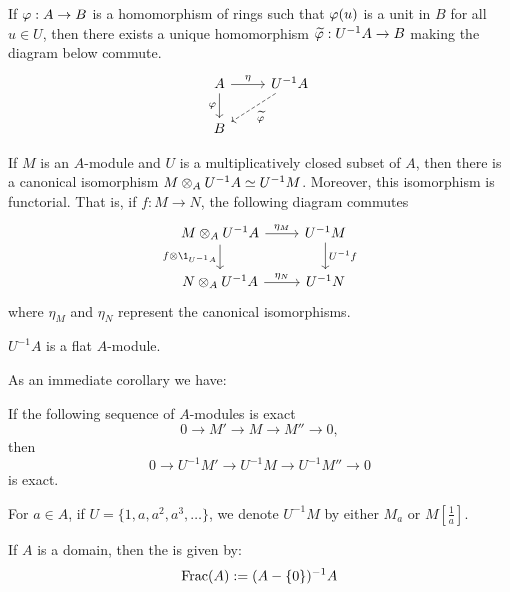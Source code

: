 \documentclass{ximera}
\begin{document}
\begin{proposition}
  If $\varphi:A\to B$ is a homomorphism of rings such that $\varphi(u)$ is a
  unit in $B$ for all $u\in U$, then there exists a unique
  homomorphism $\widetilde{\varphi}: U^{-1}A\to B$ making the diagram below
  commute.
  \[
  \begin{tikzcd}
    A \arrow[r,"\eta"] \arrow[d,swap,"\ph"] & U^{-1}A  \arrow[dl,dashed,"\tilde{\ph}"]\\
    B &
  \end{tikzcd}
  \]
\end{proposition}


\begin{proposition}
  If $M$ is an $A$-module and $U$ is a multiplicatively closed subset
  of $A$, then there is a canonical isomorphism $M\otimes_A U^{-1}
  A\simeq U^{-1}M$. Moreover, this isomorphism is functorial. That is,
  if $f:M\to N$, the following diagram commutes
  \[
  \begin{tikzcd}
  M\tensor_A U^{-1}A \arrow[r,"\eta_M"] \arrow[d,swap,"f\tensor \1_{U^{-1}A}"] & U^{-1}M \arrow[d,"U^{-1}f"]\\
  N\tensor_A U^{-1} A \arrow[r,"\eta_N"] & U^{-1}N
  \end{tikzcd}
  \]
  where $\eta_M$  and $\eta_N$ represent the canonical isomorphisms.
\end{proposition}



\begin{proposition} $U^{-1}A$ is a flat $A$-module.
\end{proposition}

As an immediate corollary we have:

\begin{corollary} If the following sequence of $A$-modules is exact
\[
0\to M' \to M \to M'' \to 0,
\]
then
\[
0\to U^{-1}M' \to U^{-1}M \to U^{-1}M'' \to 0
\]
is exact.
\end{corollary}


\begin{definition} For $a\in A$, if $U = \{1,a,a^2,a^3,\dots\}$, we denote $U^{-1}M$ by either $M_a$ or $M[\frac{1}{a}]$.
\end{definition}

\begin{definition} If $A$ is a domain, then the  is given by:
\[
\operatorname{Frac}(A) :=(A-\{0\})^{-1}A
\]
\end{definition}
\end{document}
